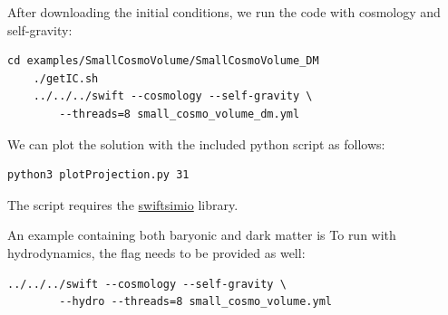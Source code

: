 After downloading the initial conditions, we run the code with cosmology and
self-gravity:

\begin{lstlisting}[style=codeblock]
    cd examples/SmallCosmoVolume/SmallCosmoVolume_DM
    ./getIC.sh
    ../../../swift --cosmology --self-gravity \
        --threads=8 small_cosmo_volume_dm.yml
\end{lstlisting}


We can plot the solution with the included python script
as follows:

\begin{lstlisting}[style=codeblock]
    python3 plotProjection.py 31
\end{lstlisting}

The  script requires the
\href{https://swiftsimio.readthedocs.io/en/latest/}{swiftsimio}
library.

An example containing both baryonic and dark matter is
 To run with
hydrodynamics, the \inlinecode{--hydro} flag needs to be provided as well:

\begin{lstlisting}[style=codeblock]
    ../../../swift --cosmology --self-gravity \
        --hydro --threads=8 small_cosmo_volume.yml
\end{lstlisting}



